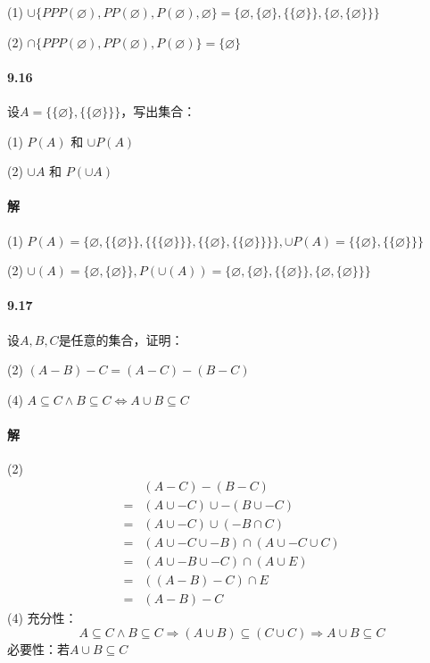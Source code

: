 \documentclass[UTF8]{ctexart}
\begin{document}
(1) $ \cup \{ PPP(\varnothing), PP(\varnothing), P(\varnothing), \varnothing \} = \{ \varnothing, \{ \varnothing \} , \{ \{ \varnothing \} \} , \{ \varnothing, \{ \varnothing \} \} \} $

(2) $ \cap \{ PPP(\varnothing), PP(\varnothing), P(\varnothing) \} = \{ \varnothing \} $

\paragraph{9.16} \label{9.16}
设$ A = \{ \{ \varnothing \}, \{ \{ \varnothing \} \} \} $，写出集合：

(1) $ P(A) $ 和 $ \cup P(A) $

(2) $ \cup A $ 和 $ P( \cup A) $

\paragraph{解}
(1) $ P(A) = \{ \varnothing, \{ \{ \varnothing \} \} , \{ \{ \{ \varnothing \} \} \} , \{ \{ \varnothing \} , \{ \{ \varnothing \} \} \} \} , \cup P(A) = \{ \{ \varnothing \} , \{ \{ \varnothing \} \} \} $

(2) $ \cup (A) = \{ \varnothing, \{ \varnothing \} \} , P( \cup (A)) = \{ \varnothing, \{ \varnothing \} , \{ \{ \varnothing \} \} , \{ \varnothing, \{ \varnothing \} \} \} $

\paragraph{9.17} \label{9.17}
设$A,B,C$是任意的集合，证明：

(2) $(A-B)-C=(A-C)-(B-C)$

(4) $A\subseteq C \land B\subseteq C \Leftrightarrow A \cup B\subseteq C$

\paragraph{解}
(2)
\begin{align*}
    & (A-C) - (B-C) \\
    = & (A \cup -C) \cup -(B \cup -C) \\
    = & (A \cup -C) \cup (-B \cap C) \\
    = & (A \cup -C \cup -B) \cap (A \cup -C \cup C) \\
    = & (A \cup -B \cup -C) \cap (A \cup E) \\
    = & ((A-B) - C) \cap E \\
    = & (A-B)-C
\end{align*}
(4) 充分性：
$$A\subseteq C \land B\subseteq C \Rightarrow (A \cup B)\subseteq (C \cup C) \Rightarrow A \cup B\subseteq C$$
必要性：若$A \cup B \subseteq C$
\end{document}
